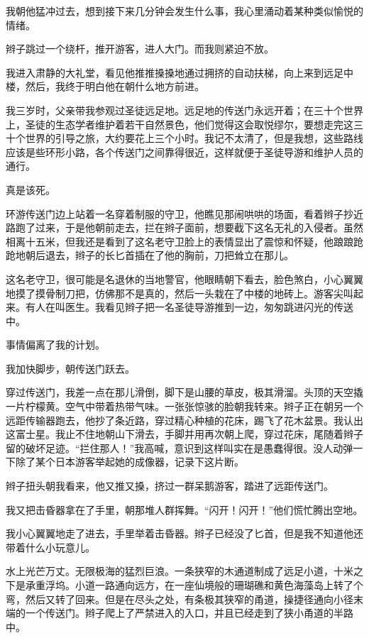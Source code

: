 \documentclass[AutoFakeBold=true]{book}
\begin{document}
我朝他猛冲过去，想到接下来几分钟会发生什么事，我心里涌动着某种类似愉悦的情绪。

辫子跳过一个绕杆，推开游客，进人大门。而我则紧迫不放。

我进入肃静的大礼堂，看见他推推搡搡地通过拥挤的自动扶梯，向上来到远足中楼，然后，我终于明白他在朝什么地方前进。

我三岁时，父亲带我参观过圣徒远足地。远足地的传送门永远开着；在三十个世界上，圣徒的生态学者维护着若干自然景色，他们觉得这会取悦缪尔，要想走完这三十个世界的引导之旅，大约要花上三个小时。我记不太清了，但是我想，这些路线应该是些环形小路，各个传送门之间靠得很近，这样就便于圣徒导游和维护人员的通行。

{\kaishu 真是该死。}

环游传送门边上站着一名穿着制服的守卫，他瞧见那闹哄哄的场面，看着辫子抄近路跑了过来，于是他朝前走去，拦在辫子面前，想要截下这名无礼的入侵者。虽然相离十五米，但我还是看到了这名老守卫脸上的表情显出了震惊和怀疑，他踉踉跄跄地朝后退去，辫子的长匕首插在了他的胸前，刀把耸立在那儿。

这名老守卫，很可能是名退休的当地警官，他眼睛朝下看去，脸色煞白，小心翼翼地摸了摸骨制刀把，仿佛那不是真的，然后一头栽在了中楼的地砖上。游客尖叫起来。有人在叫医生。我看见辫子把一名圣徒导游推到一边，匆匆跳进闪光的传送中。

事情偏离了我的计划。

我加快脚步，朝传送门跃去。

穿过传送门，我差一点在那儿滑倒，脚下是山腰的草皮，极其滑溜。头顶的天空撬一片柠檬黄。空气中带着热带气味。一张张惊骇的脸朝我转来。辫子正在朝另一个远距传输器跑去，他抄了条近路，穿过精心种植的花床，踢飞了花木盆景。我认出这富士星。我止不住地朝山下滑去，手脚并用再次朝上爬，穿过花床，尾随着辫子留的破坏足迹。``拦住那人！''我高喊，意识到这样叫实在是愚蠢得很。没人动弹一下除了某个日本游客举起她的成像器，记录下这片断。

辫子扭头朝我看来，他又推又搡，挤过一群呆鹅游客，踏进了远距传送门。

我又把击昏器拿在了手里，朝那堆人群挥舞。``闪开！闪开！''他们慌忙腾出空地。

我小心翼翼地走了进去，手里举着击昏器。辫子已经没了匕首，但是我不知道他还带着什么小玩意儿。

水上光芒万丈。无限极海的猛烈巨浪。一条狭窄的木通道制成了远足小道，十米之下是承重浮坞。小道一路通向远方，在一座仙境般的珊瑚礁和黄色海藻岛上转了个弯，然后又转了回来。但是在尽头之处，有条极其狭窄的甬道，操捷径通向小径末端的一个传送门。辫子爬上了{\heiti 严禁进入}的入口，并且已经走到了狭小甬道的半路中。
\end{document}
